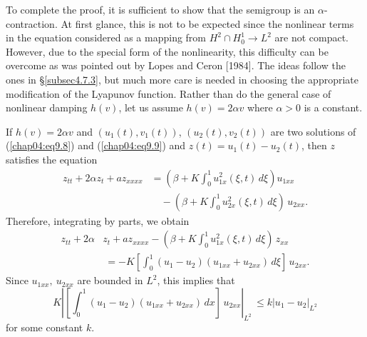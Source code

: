 \documentclass{surv-l}
\theoremstyle{plain}
\theoremstyle{definition}
\numberwithin{equation}{section}
\numberwithin{figure}{chapter}
\begin{document}
To complete the proof, it is sufficient to show that the semigroup is an $\alpha$-contraction. At first glance, this is not to be expected since the nonlinear terms in the equation considered as a mapping from $H^{2}\cap H_{0}^{1}\rightarrow L^{2}$ are not compact. However, due to the special form of the nonlinearity, this difficulty can be overcome as was pointed out by Lopes and Ceron [1984]. The ideas follow the ones in \S\ref{subsec4.7.3}, but much more care is needed in choosing the appropriate modification of the Lyapunov function. Rather than do the general case of nonlinear damping $h(v)$, let us assume $h(v)=2\alpha v$ where $\alpha>0$ is a constant.

If $h(v)=2\alpha v$ and $(u_{1}(t), v_{1}(t))$, $(u_{2}(t), v_{2}(t))$ are two solutions of (\ref{chap04:eq9.8}) and (\ref{chap04:eq9.9}) and $z(t)=u_{1}(t)-u_{2}(t)$, then $z$ satisfies the equation
\begin{align*}
z_{tt}+2\alpha z_{t}+az_{xxxx}&=\left(\beta+K\int_{0}^{1}u_{1x}^{2}(\xi,t)\,d\xi\right)u_{1xx}\\
&\quad-\left(\beta+K\int_{0}^{1}u_{2x}^{2}(\xi, t)\,d\xi\right)\,u_{2xx}.
\end{align*}
Therefore, integrating by parts, we obtain
\begin{equation}\label{chap04:eq9.10}
\begin{split}
z_{tt}+2\alpha &z_{t}+az_{xxxx}-\left(\beta+K\int_{0}^{1}u_{1x}^{2}(\xi, t)\,d\xi\right)\,z_{xx}\\
&\ =-K\left[\int_{0}^{1}(u_{1}-u_{2})(u_{1xx}+u_{2xx})\,d\xi\right]\,u_{2xx}.
\end{split}
\end{equation}
Since $u_{1xx},\ u_{2xx}$ are bounded in $L^{2}$, this implies that
\begin{equation*}
K\left|\left[\int_{0}^{1}(u_{1}-u_{2})(u_{1xx}+u_{2xx})\,dx\right]\,u_{2xx}\right|_{L^{2}}\,\leq k|u_{1}-u_{2}|_{L^{2}}
\end{equation*}
for some constant $k$.
\end{document}
